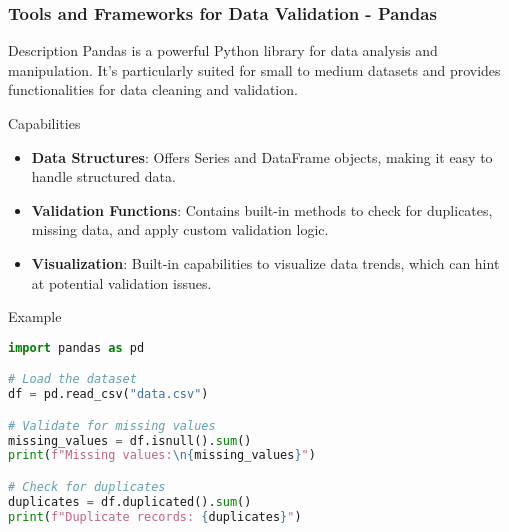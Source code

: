 \documentclass[aspectratio=169]{beamer}
\begin{document}
\begin{frame}[fragile]
    \frametitle{Tools and Frameworks for Data Validation - Pandas}
    \begin{block}{Description}
        Pandas is a powerful Python library for data analysis and manipulation. It's particularly suited for small to medium datasets and provides functionalities for data cleaning and validation.
    \end{block}
    \begin{block}{Capabilities}
        \begin{itemize}
            \item \textbf{Data Structures}: Offers Series and DataFrame objects, making it easy to handle structured data.
            \item \textbf{Validation Functions}: Contains built-in methods to check for duplicates, missing data, and apply custom validation logic.
            \item \textbf{Visualization}: Built-in capabilities to visualize data trends, which can hint at potential validation issues.
        \end{itemize}
    \end{block}
    \begin{block}{Example}
        \begin{lstlisting}[language=Python, basicstyle=\footnotesize]
import pandas as pd

# Load the dataset
df = pd.read_csv("data.csv")

# Validate for missing values
missing_values = df.isnull().sum()
print(f"Missing values:\n{missing_values}")

# Check for duplicates
duplicates = df.duplicated().sum()
print(f"Duplicate records: {duplicates}")
        \end{lstlisting}
    \end{block}
\end{frame}
\end{document}
